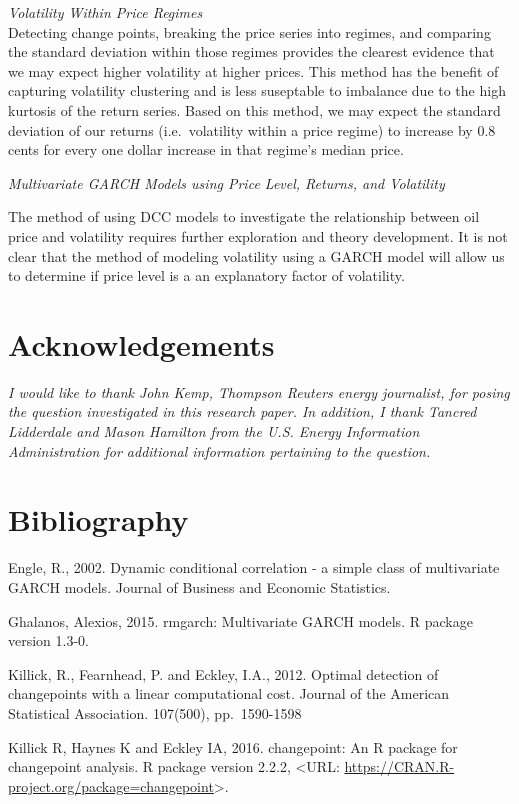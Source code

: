 \documentclass[]{article}
\begin{document}
\emph{Volatility Within Price Regimes}\\
Detecting change points, breaking the price series into regimes, and
comparing the standard deviation within those regimes provides the
clearest evidence that we may expect higher volatility at higher prices.
This method has the benefit of capturing volatility clustering and is
less suseptable to imbalance due to the high kurtosis of the return
series. Based on this method, we may expect the standard deviation of
our returns (i.e.~volatility within a price regime) to increase by 0.8
cents for every one dollar increase in that regime's median price.

\emph{Multivariate GARCH Models using Price Level, Returns, and
Volatility}

The method of using DCC models to investigate the relationship between
oil price and volatility requires further exploration and theory
development. It is not clear that the method of modeling volatility
using a GARCH model will allow us to determine if price level is a an
explanatory factor of volatility.

\section{Acknowledgements}\label{acknowledgements}

\emph{I would like to thank John Kemp, Thompson Reuters energy
journalist, for posing the question investigated in this research paper.
In addition, I thank Tancred Lidderdale and Mason Hamilton from the U.S.
Energy Information Administration for additional information pertaining
to the question.}

\section{Bibliography}\label{bibliography}

Engle, R., 2002. Dynamic conditional correlation - a simple class of
multivariate GARCH models. Journal of Business and Economic Statistics.

Ghalanos, Alexios, 2015. rmgarch: Multivariate GARCH models. R package
version 1.3-0.

Killick, R., Fearnhead, P. and Eckley, I.A., 2012. Optimal detection of
changepoints with a linear computational cost. Journal of the American
Statistical Association. 107(500), pp.~1590-1598

Killick R, Haynes K and Eckley IA, 2016. changepoint: An R package for
changepoint analysis. R package version 2.2.2, \textless{}URL:
\url{https://CRAN.R-project.org/package=changepoint}\textgreater{}.
\end{document}
